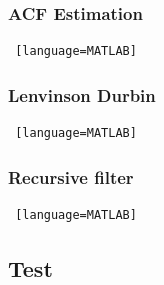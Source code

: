 \subsubsection{ACF Estimation}
\begin{lstlisting} [language=MATLAB]

\end{lstlisting}

\subsubsection{Lenvinson Durbin}
\begin{lstlisting} [language=MATLAB]

\end{lstlisting}

\subsubsection{Recursive filter}
\begin{lstlisting} [language=MATLAB]

\end{lstlisting}

\subsection{Test}





